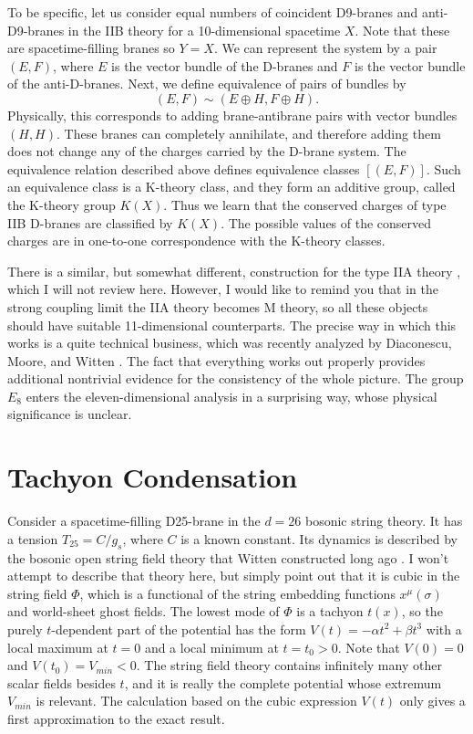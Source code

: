 \documentclass[a4paper,12pt]{article}
\begin{document}
To be specific, let us consider equal numbers of coincident
D9-branes  and anti-D9-branes in the IIB theory for a
10-dimensional spacetime $X$.  Note that these are
spacetime-filling branes so $Y = X$.  We can represent the system
by a pair $(E, F)$, where $E$ is the vector bundle of the D-branes
and $F$ is the vector bundle of the anti-D-branes.  Next, we
define equivalence of pairs of bundles by
\begin{equation}
(E,F) \sim (E \oplus H, F \oplus H).
\end{equation}
Physically, this corresponds to adding brane-antibrane pairs with
vector bundles $(H,H)$. These branes can completely annihilate,
and therefore adding them does not change any of the charges
carried by the D-brane system. The equivalence relation described
above defines equivalence classes $[(E,F)]$. Such an equivalence
class is a K-theory class, and they form an additive group, called
the K-theory group $K(X)$. Thus we learn that the conserved
charges of type IIB D-branes are classified by $K(X)$. The
possible values of the conserved charges are in one-to-one
correspondence with the K-theory classes.

There is a similar, but somewhat different, construction for the
type IIA theory \cite{PH}, which I will not review here.  However, I would
like to remind you that in the strong coupling limit the IIA
theory becomes M theory, so all these objects should have suitable
11-dimensional counterparts.  The precise way in which this works
is a quite technical business, which was recently analyzed by
Diaconescu, Moore, and Witten \cite{DMW}.  The fact that everything works out
properly provides additional nontrivial evidence for the
consistency of the whole picture.  The group $E_8$ enters the
eleven-dimensional analysis in a surprising way, whose physical
significance is unclear.

\section{Tachyon Condensation}

Consider a spacetime-filling D25-brane in the $d=26$ bosonic
string theory.  It has a tension $T_{25} = C/g_s$, where $C$ is a
known constant.  Its dynamics is described by the bosonic open
string field theory that Witten constructed long ago \cite{W3}.  I won't
attempt to describe that theory here, but simply point out that it
is cubic in the string field $\Phi$, which is a functional of the
string embedding functions $x^\mu (\sigma)$ and world-sheet ghost
fields.  The lowest mode of $\Phi$ is a tachyon $t(x)$, so the
purely $t$-dependent part of the potential has the form $V(t) = -
\alpha t^2 + \beta t^3$ with a local maximum at $t = 0$ and a
local minimum at $t = t_0 > 0$.  Note that $V(0) = 0$ and $V(t_0)
= V_{min} < 0$.  The string field theory contains infinitely many
other scalar fields besides $t$, and it is really the complete
potential whose extremum $V_{min}$ is relevant.  The calculation
based on the cubic expression $V(t)$ only gives a first
approximation to the exact result.
\end{document}
